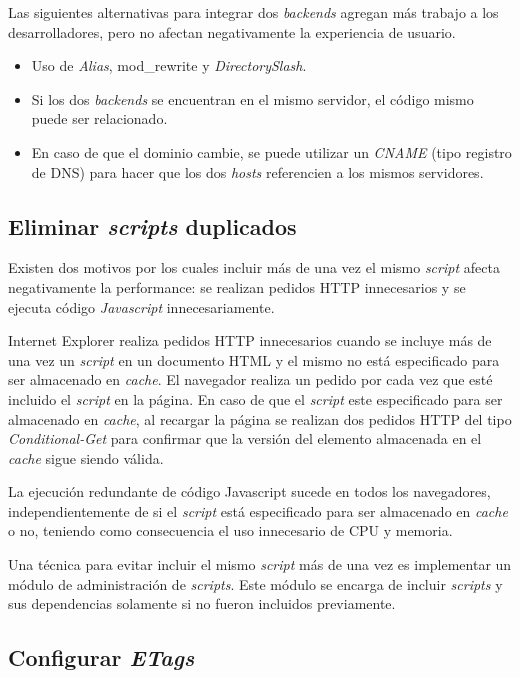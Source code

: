 Las siguientes alternativas para integrar dos \emph{backends} agregan más trabajo a los desarrolladores, pero no afectan negativamente la experiencia de usuario.
\begin{itemize}
\item
Uso de \emph{Alias}, mod\_rewrite y \emph{DirectorySlash}.
\item
Si los dos \emph{backends} se encuentran en el mismo servidor, el código mismo puede ser relacionado.
\item
En caso de que el dominio cambie, se puede utilizar un \emph{CNAME} (tipo registro de DNS)  para hacer
que los dos \emph{hosts} referencien a los mismos servidores.
\end{itemize}

\subsection{Eliminar \emph{scripts} duplicados}

Existen dos motivos por los cuales incluir más de una vez el mismo \emph{script} afecta negativamente la performance: se realizan pedidos HTTP innecesarios
y se ejecuta código \emph{Javascript} innecesariamente.

Internet Explorer realiza pedidos HTTP innecesarios cuando se incluye más de una vez un \emph{script} en
un documento HTML y el mismo no está especificado para ser almacenado en \emph{cache}. El navegador realiza un pedido por cada vez que esté incluido el \emph{script} en la página.
En caso de que el \emph{script} este especificado para ser almacenado en \emph{cache}, al recargar la página se realizan dos pedidos HTTP del tipo \emph{Conditional-Get} para
confirmar que la versión del elemento almacenada en el \emph{cache} sigue siendo válida.

La ejecución redundante de código Javascript sucede en todos los navegadores, independientemente de si el \emph{script} está especificado para ser almacenado
en \emph{cache} o no, teniendo como consecuencia el uso innecesario de CPU y memoria.

Una técnica para evitar incluir el mismo \emph{script} más de una vez es implementar un módulo de administración de \emph{scripts}. Este módulo se encarga de incluir
\emph{scripts} y sus dependencias solamente si no fueron incluidos previamente.

\subsection{Configurar \emph{ETags}}


